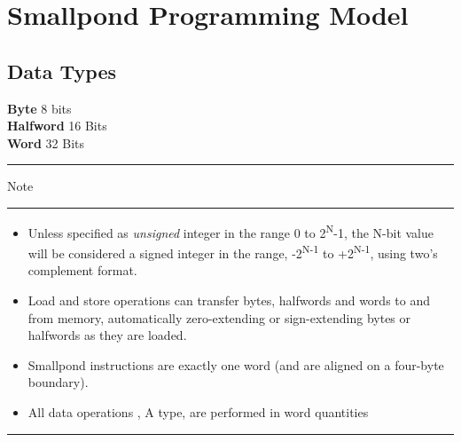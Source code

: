 \documentclass[12pt]{article}
\begin{document}
\newpage

\section{Smallpond Programming Model}
    \subsection{Data Types}
        \textbf{Byte} \hspace{2cm}8 bits\\
        \textbf{Halfword} \hspace{1.05cm}16 Bits\\
        \textbf{Word} \hspace{1.8cm}32 Bits\\
        
       \noindent\rule{1.5cm}{0.3pt}Note\rule{1.5cm}{0.3pt}
       
       \begin{itemize}
           \item Unless specified as \textit{unsigned} integer in the range 0 to 2\textsuperscript{N}-1, the N-bit value will be considered a signed integer in the range, -2\textsuperscript{N-1} to +2\textsuperscript{N-1}, using two's complement format.
           
           \item Load and store operations can transfer bytes, halfwords and words to and from memory,
            automatically zero-extending or sign-extending bytes or halfwords as they are loaded.
    
           \item Smallpond instructions are exactly one word (and are aligned on a four-byte boundary).
           
           \item All data operations , A type, are performed in word quantities
       \end{itemize}
   
   \noindent\rule{4cm}{0.3pt}
   
\end{document}
